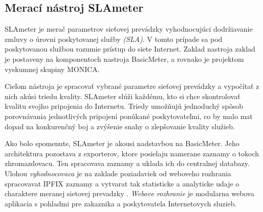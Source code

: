 \subsection{Merací nástroj SLAmeter}

SLAmeter je merač parametrov sieťovej prevádzky vyhodnocujúci dodržiavanie zmluvy o úrovni poskytovanej 
služby \emph{(SLA)}. V tomto prípade sa pod poskytovanou službou rozumie prístup do siete 
Internet. Zaklad nastroja zaklad je postaveny na komponentoch nastroja BasicMeter, a rovnako je projektom 
vyskumnej skupiny MONICA. 

Cieľom nástroja je spracovať vybrané parametre sieťovej prevádzky a vypočítať z nich akúsi triedu 
kvality. SLAmeter slúži každému, kto si chce skontrolovať kvalitu svojho pripojenia do Internetu. 
Triedy umožňujú jednoduchý spôsob porovnávania jednotlivých pripojení ponúkané poskytovateľmi, 
co by malo mat dopad na konkurenčný boj a zvýšenie snahy o zlepšovanie kvality služieb. \citep{slameter}

Ako bolo spomenute, SLAmeter je akousi nadstavbou na BasicMeter. Jeho architektura pozostava z exporterov,
ktore posielaju namerane zaznamy o tokoch zhromazdovacu. Ten spracovava zaznamy a uklada ich do 
centralnej databazy. Ulohou \emph{vyhodnocovaca} je na zaklade poziadaviek od weboveho rozhrania 
spracovavat IPFIX zaznamy a vytvarat tak statisticke a analyticke udaje o charaktere 
meranej sietovej prevadzky \citep{evaluator}. \emph{Webove rozhranie} je modularna webova aplikacia 
s pohladmi pre zakaznika a poskytovatela Internetovych sluzieb.